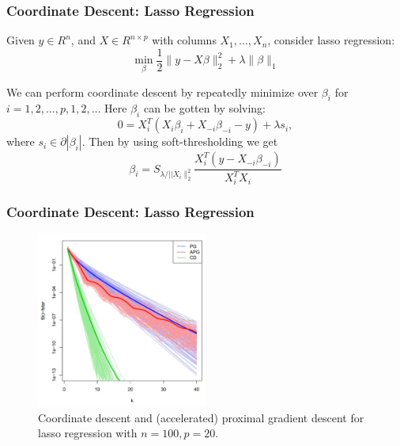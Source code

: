 \begin{frame}
\frametitle{Coordinate Descent: Lasso Regression}
Given $y \in R^n$, and $X \in R^{n \times p}$ with columns $X_1, \ldots, X_n$, consider lasso regression:
$$
\min _\beta \frac{1}{2}\|y-X \beta\|_2^2+\lambda\|\beta\|_1
$$

We can perform coordinate descent by repeatedly minimize over $\beta_i$ for $i=1,2, \ldots, p, 1,2, \ldots$ Here $\beta_i$ can be gotten by solving:
$$
0=X_i^T\left(X_i \beta_i+X_{-i} \beta_{-i}-y\right)+\lambda s_i,
$$
where $s_i \in \partial\left|\beta_i\right|$. Then by using soft-thresholding we get
$$
\beta_i=S_{\lambda /|| X_i \|_2^2} \frac{X_i^T\left(y-X_{-i} \beta_{-i}\right)}{X_i^T X_i}
$$
\end{frame}

\begin{frame}
    \frametitle{Coordinate Descent: Lasso Regression}
\begin{figure}[!htbp]
    \begin{center}
        \includegraphics[width=0.5\textwidth]{img/cd_lasso.png}
    \end{center}
    \caption{Coordinate descent and (accelerated) proximal gradient descent for lasso regression with $n=100,p=20$.}\label{fig:cd_lasso}
\end{figure}
\end{frame}

